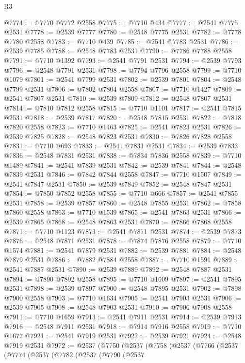 \begin{lexlean}{R3}
\begin{coremodule}
@7774 := @7770 @7772 @2558
@7775 := @7710 @434
@7777 := @2541 @7775 @2531
@7778 := @2539 @7777
@7780 := @2548 @7775 @2531
@7782 := @7778 @7780 @2558
@7783 := @7710 @439
@7785 := @2541 @7783 @2531
@7786 := @2539 @7785
@7788 := @2548 @7783 @2531
@7790 := @7786 @7788 @2558
@7791 := @7710 @1392
@7793 := @2541 @7791 @2531
@7794 := @2539 @7793
@7796 := @2548 @7791 @2531
@7798 := @7794 @7796 @2558
@7799 := @7710 @1079
@7801 := @2541 @7799 @2531
@7802 := @2539 @7801
@7804 := @2548 @7799 @2531
@7806 := @7802 @7804 @2558
@7807 := @7710 @1427
@7809 := @2541 @7807 @2531
@7810 := @2539 @7809
@7812 := @2548 @7807 @2531
@7814 := @7810 @7812 @2558
@7815 := @7710 @1101
@7817 := @2541 @7815 @2531
@7818 := @2539 @7817
@7820 := @2548 @7815 @2531
@7822 := @7818 @7820 @2558
@7823 := @7710 @1463
@7825 := @2541 @7823 @2531
@7826 := @2539 @7825
@7828 := @2548 @7823 @2531
@7830 := @7826 @7828 @2558
@7831 := @7710 @693
@7833 := @2541 @7831 @2531
@7834 := @2539 @7833
@7836 := @2548 @7831 @2531
@7838 := @7834 @7836 @2558
@7839 := @7710 @1489
@7841 := @2541 @7839 @2531
@7842 := @2539 @7841
@7844 := @2548 @7839 @2531
@7846 := @7842 @7844 @2558
@7847 := @7710 @1507
@7849 := @2541 @7847 @2531
@7850 := @2539 @7849
@7852 := @2548 @7847 @2531
@7854 := @7850 @7852 @2558
@7855 := @7710 @666
@7857 := @2541 @7855 @2531
@7858 := @2539 @7857
@7860 := @2548 @7855 @2531
@7862 := @7858 @7860 @2558
@7863 := @7710 @1539
@7865 := @2541 @7863 @2531
@7866 := @2539 @7865
@7868 := @2548 @7863 @2531
@7870 := @7866 @7868 @2558
@7871 := @7710 @1123
@7873 := @2541 @7871 @2531
@7874 := @2539 @7873
@7876 := @2548 @7871 @2531
@7878 := @7874 @7876 @2558
@7879 := @7710 @1574
@7881 := @2541 @7879 @2531
@7882 := @2539 @7881
@7884 := @2548 @7879 @2531
@7886 := @7882 @7884 @2558
@7887 := @7710 @1591
@7889 := @2541 @7887 @2531
@7890 := @2539 @7889
@7892 := @2548 @7887 @2531
@7894 := @7890 @7892 @2558
@7895 := @7710 @1609
@7897 := @2541 @7895 @2531
@7898 := @2539 @7897
@7900 := @2548 @7895 @2531
@7902 := @7898 @7900 @2558
@7903 := @7710 @1634
@7905 := @2541 @7903 @2531
@7906 := @2539 @7905
@7908 := @2548 @7903 @2531
@7910 := @7906 @7908 @2558
@7911 := @7710 @1659
@7913 := @2541 @7911 @2531
@7914 := @2539 @7913
@7916 := @2548 @7911 @2531
@7918 := @7914 @7916 @2558
@7919 := @7710 @1677
@7921 := @2541 @7919 @2531
@7922 := @2539 @7921
@7924 := @2548 @7919 @2531
@7972 := @2537
    (@7750
      (@2537
        (@7758
          (@2537
            (@7766
              (@2537
                (@7774
                  (@2537
                    (@7782
                      (@2537
                        (@7790
                          (@2537

\end{coremodule}
\end{lexlean}
